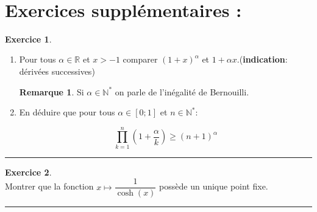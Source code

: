\documentclass[10pt,a4paper]{article}
\newcommand{\R}{\mathbb{R}}
\newcommand{\N}{\mathbb{N}}
\theoremstyle{definition}
\newtheorem*{remarque}{Remarque}
\theoremstyle{definition}
\newtheorem{exo}{Exercice}
\begin{document}
\quad\\
\section*{Exercices supplémentaires :}

\begin{center}
\begin{minipage}[t]{0.47\linewidth}
\raggedright


\begin{exo}\quad\\
\begin{enumerate}
\item Pour tous $\alpha\in\R$ et $x>-1$ comparer $\left(1+x\right)^{\alpha}$ et $1+\alpha x$.\quad (\textbf{indication}: dérivées successives)

\begin{remarque}
Si $\alpha\in\N^*$ on parle de l'inégalité de Bernouilli.
\end{remarque}
\item En déduire que pour tous $\alpha\in[0;1]$ et $n\in\N^{*}:$

$$\prod_{k=1}^{n}\left(1+\dfrac{\alpha}{k}\right) \geq \left(n+1\right)^{\alpha}$$
\end{enumerate}

\end{exo}
\begin{center}
\rule{1\linewidth}{0.6pt}
\end{center}

\begin{exo}\quad\\
Montrer que la fonction 
$x \longmapsto \dfrac{1}{\cosh(x)}$ possède un unique point fixe.
\end{exo}

\begin{center}
\rule{1\linewidth}{0.6pt}
\end{center}

\end{minipage}	
\hfill\vrule\hfill
\begin{minipage}[t]{0.47\linewidth}
\raggedright


\end{minipage}
\end{center}
\end{document}
